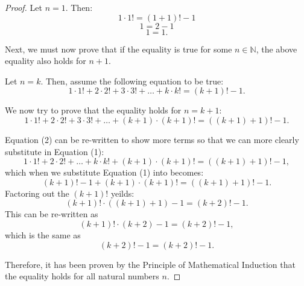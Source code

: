\documentclass[10pt]{article}
\theoremstyle{definition}
\theoremstyle{plain}
\newcommand{\N}{\mathbb{N}}
\begin{document}
\setcounter{equation}{0}
\begin{proof}
  Let $n=1$. Then:
  $$1\cdot 1! = (1+1)! - 1$$
  $$1 = 2 - 1$$
  $$1 = 1.$$

  \par Next, we must now prove that if the equality is true for some $n\in\N$, the above equality also holds for $n+1$.

  \par Let $n=k$. Then, assume the following equation to be true:
  \begin{equation}
    1 \cdot 1! + 2 \cdot 2! + 3 \cdot 3! + \dots + k \cdot k! = (k+1)! - 1.
  \end{equation}

  \par We now try to prove that the equality holds for $n=k+1$:
  \begin{equation}
    1 \cdot 1! + 2 \cdot 2! + 3 \cdot 3! + \dots + (k+1)\cdot (k+1)! = ((k+1)+1)! - 1.
  \end{equation}

  \par Equation (2) can be re-written to show more terms so that we can more clearly substitute in Equation (1):
  $$1 \cdot 1! + 2 \cdot 2! + \dots + k \cdot k! + (k+1)\cdot (k+1)! = ((k+1)+1)! - 1,$$
  which when we substitute Equation (1) into becomes:
  $$(k+1)! - 1 + (k+1)\cdot (k+1)! = ((k+1)+1)! - 1.$$
  Factoring out the $(k+1)!$ yeilds:
  $$(k+1)! \cdot ((k+1)+1) - 1 = (k+2)! - 1.$$
  This can be re-written as
  $$(k+1)! \cdot (k+2) - 1 = (k+2)! - 1,$$
  which is the same as
  \begin{equation}
    (k+2)! - 1 = (k+2)! - 1.
  \end{equation}

  \par Therefore, it has been proven by the Principle of Mathematical Induction that the equality holds for all natural numbers $n$.
\end{proof}
\end{document}
